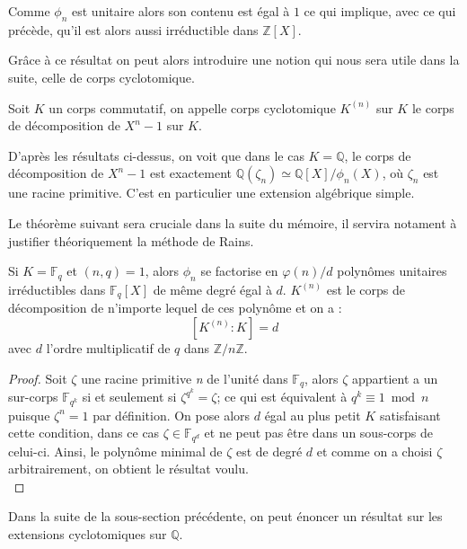\documentclass[a4paper]{article} %
\numberwithin{section}{part}
\numberwithin{equation}{section}
\newcommand\nroot[1]{\textit{#1}\up{\textit{ième}}}
\newcommand\zmodn[1]{\mathbb{Z}/#1\mathbb{Z}}
\newcommand\GF[1]{\mathbb{F}_{#1}}
\newcommand\QQ{\mathbb{Q}}
\newcommand\ZZ{\mathbb{Z}}
\begin{document}
\begin{rem}
Comme $\phi_n$ est unitaire alors son contenu est égal à $1$ ce qui implique, 
avec ce qui précède, qu'il est alors aussi irréductible dans $\ZZ[X]$.
\end{rem}
\vspace{0.3cm}
Grâce à ce résultat on peut alors introduire une notion qui nous sera utile dans
la suite, celle de corps cyclotomique.

\begin{defn}
Soit $K$ un corps commutatif, on appelle corps cyclotomique $K^{(n)}$ sur $K$ le
corps de décomposition de $X^n - 1$ sur $K$.
\end{defn}

\begin{rem}
D'après les résultats ci-dessus, on voit que dans le cas $K = \QQ$, le 
corps de décomposition de $X^n - 1$ est exactement $\QQ(\zeta_n) \simeq 
\QQ[X]/\phi_n(X)$, où $\zeta_n$ est une racine primitive. C'est en 
particulier une extension algébrique simple.
\end{rem}

Le théorème suivant sera cruciale dans la suite du mémoire, il servira notament 
à justifier théoriquement la méthode de Rains.

\begin{thm}
\label{polycycldecomp}
Si $K = \GF{q}$ et $(n,q) = 1$, alors $\phi_n$ se factorise en $\varphi(n)/d$ 
polynômes unitaires irréductibles dans $\GF{q}[X]$ de même degré égal à $d$. 
$K^{(n)}$ est le corps de décomposition de n'importe lequel de ces polynôme et 
on a :
\[[K^{(n)}:K] = d\]
avec $d$ l'ordre multiplicatif de $q$ dans $\zmodn{n}$.
\end{thm}
\begin{proof}
Soit $\zeta$ une racine primitive \nroot{n} de l'unité dans $\GF{q}$, alors 
$\zeta$ appartient a un sur-corps $\GF{q^k}$ si et seulement si $\zeta^{q^k} = 
\zeta$; ce qui est équivalent à $q^k \equiv 1 \bmod n$ puisque $\zeta^n = 1$ par
définition. On pose alors $d$ égal au plus petit $K$ satisfaisant cette 
condition, dans ce cas $\zeta\in\GF{q^d}$ et ne peut pas être dans un sous-corps
de celui-ci. Ainsi, le polynôme minimal de $\zeta$ est de degré $d$ et comme on 
a choisi $\zeta$ arbitrairement, on obtient le résultat voulu.\\
\end{proof}

Dans la suite de la sous-section précédente, on peut énoncer un résultat sur les
extensions cyclotomiques sur $\QQ$.
\end{document}
